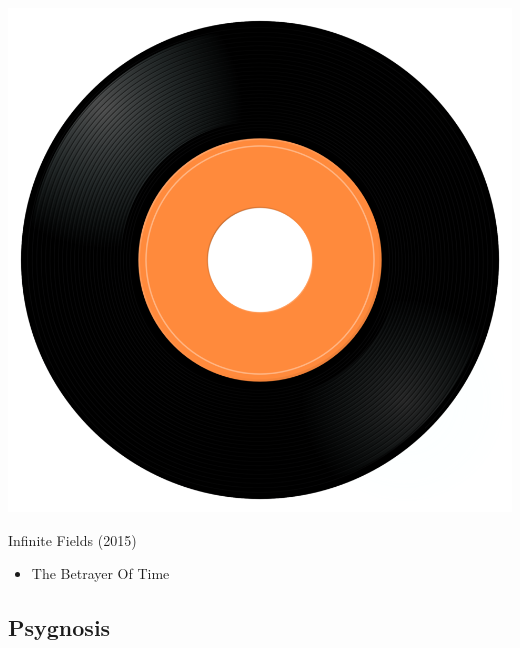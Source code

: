 \begin{minipage}[t]{0.25\textwidth}\vspace{0pt}
\captionsetup{type=figure}
\includegraphics[width=\textwidth]{Images/cover.png}
\caption*{Infinite Fields (2015)}
\end{minipage}
\begin{minipage}[t]{0.25\textwidth}\vspace{0pt}
\begin{itemize}[nosep,leftmargin=1em,labelwidth=*,align=left]
	\setlength{\itemsep}{0pt}
	\item The Betrayer Of Time
\end{itemize}
\end{minipage}

\subsection{Psygnosis}

